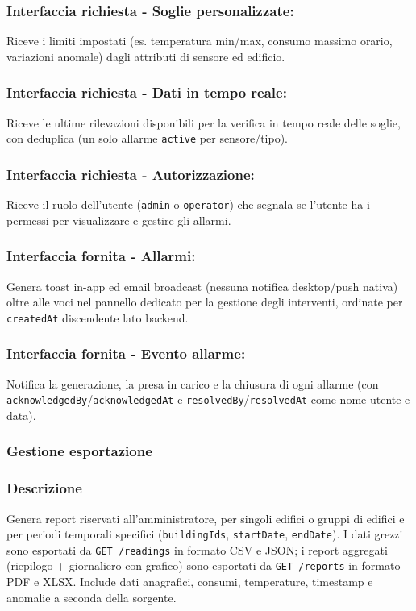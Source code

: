         \subsubsection*{Interfaccia richiesta - Soglie personalizzate:}
            Riceve i limiti impostati (es. temperatura min/max, consumo massimo orario, variazioni anomale) dagli attributi di sensore ed edificio.
        \subsubsection*{Interfaccia richiesta - Dati in tempo reale:}
            Riceve le ultime rilevazioni disponibili per la verifica in tempo reale delle soglie, con deduplica (un solo allarme \texttt{active} per sensore/tipo).
        \subsubsection*{Interfaccia richiesta - Autorizzazione:}
            Riceve il ruolo dell'utente (\texttt{admin} o \texttt{operator}) che segnala se l'utente ha i permessi per visualizzare e gestire gli allarmi.
        \subsubsection*{Interfaccia fornita - Allarmi:}
            Genera toast in-app ed email broadcast (nessuna notifica desktop/push nativa) oltre alle voci nel pannello dedicato per la gestione degli interventi, ordinate per \texttt{createdAt} discendente lato backend.
        \subsubsection*{Interfaccia fornita - Evento allarme:}
            Notifica la generazione, la presa in carico e la chiusura di ogni allarme (con \texttt{acknowledgedBy}/\texttt{acknowledgedAt} e \texttt{resolvedBy}/\texttt{resolvedAt} come nome utente e data).

    \subsubsection{Gestione esportazione}
        \subsubsection*{Descrizione}
            Genera report riservati all'amministratore, per singoli edifici o gruppi di edifici e per periodi temporali specifici (\texttt{buildingIds}, \texttt{startDate}, \texttt{endDate}). I dati grezzi sono esportati da \texttt{GET /readings} in formato CSV e JSON; i report aggregati (riepilogo + giornaliero con grafico) sono esportati da \texttt{GET /reports} in formato PDF e XLSX. Include dati anagrafici, consumi, temperature, timestamp e anomalie a seconda della sorgente.
